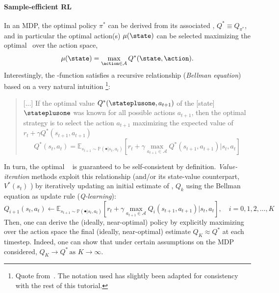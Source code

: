 \paragraph{Sample-efficient RL}
In an MDP, the optimal policy \( \pi^* \) can be derived from its associated \qfunction, \( Q^* \equiv Q_{\pi^*} \), and in particular the optimal action(s) \(\mu(\state)\) can be selected maximizing the optimal \qfunction \ over the action space,
\[
\mu(\state) = \max_{\action \in \mathcal A} Q^*(\state, \action).
\]
Interestingly, the \qopt-function satisfies a recursive relationship (\emph{Bellman equation}) based on a very natural intuition%
\footnote{Quote from~\citet{mnihPlayingAtariDeep2013}. The notation used has slightly been adapted for consistency with the rest of this tutorial.}:
\begin{quote}
    [...] If the optimal value \( Q^*(\stateplusone, a_{t+1}) \) of the [state] \(\stateplusone \) was known for all possible actions \(a_{t+1} \), then the optimal strategy is to select the action \( a_{t+1}\) maximizing the expected value of \( r_t + \gamma Q^*(s_{t+1}, a_{t+1}) \)
\[ 
Q^*(s_t, a_t) = \mathbb E_{s_{t+1} \sim \mathbb P(\bullet \vert s_t, a_t)} \left[ r_t + \gamma \max_{a_{t+1} \in \mathcal A} Q^*(s_{t+1}, a_{t+1}) \big\vert s_t, a_t  \right]
\]
\end{quote}

In turn, the optimal \qfunction \ %
is guaranteed to be self-consistent by definition.
\emph{Value-iteration} methods exploit this relationship (and/or its state-value counterpart, \( V^*(s_t) \) ) by iteratively updating an initial estimate of \qopt, \( Q_k \) using the Bellman equation as update rule (\emph{Q-learning}):
\[
    Q_{i+1}(s_t, a_t) \leftarrow \mathbb E_{s_{t+1} \sim \mathbb P(\bullet \vert s_t, a_t)} \left[ r_t + \gamma \max_{a_{t+1} \in \mathcal A} Q_i (s_{t+1}, a_{t+1}) \big\vert s_t, a_t  \right],  \quad i=0,1,2,\dots,K
\]
Then, one can derive the (ideally, near-optimal) policy by explicitly maximizing over the action space the final (ideally, near-optimal) estimate \( Q_K \approx Q^* \) at each timestep. 
Indeed, one can show that under certain assumptions on the MDP considered, \( Q_K \to Q^* \, \text{as } K \to \infty \).

